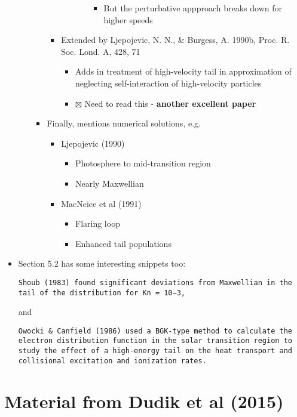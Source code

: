 \documentclass[11pt]{article}
\begin{document}
\begin{itemize}
\begin{itemize}
\begin{itemize}
\begin{itemize}
\begin{itemize}
\begin{itemize}
\begin{itemize}
\item But the perturbative appproach breaks down for higher speeds
\end{itemize}
\end{itemize}
\end{itemize}
\item Extended by Ljepojevic, N. N., \& Burgess, A. 1990b, Proc. R. Soc. Lond. A, 428, 71
\begin{itemize}
\item Adds in treatment of high-velocity tail in approximation of neglecting self-interaction of high-velocity particles
\item $\boxtimes$ Need to read this - \textbf{another excellent paper}
\end{itemize}
\end{itemize}
\item Finally, mentions numerical solutions, e.g.
\begin{itemize}
\item Ljepojevic (1990)
\begin{itemize}
\item Photosphere to mid-transition region
\item Nearly Maxwellian
\end{itemize}
\item MacNeice et al (1991)
\begin{itemize}
\item Flaring loop
\item Enhanced tail populations
\end{itemize}
\end{itemize}
\end{itemize}
\end{itemize}
\item Section 5.2 has some interesting snippets too:
\begin{verbatim}
Shoub (1983) found significant deviations from Maxwellian in the tail of the distribution for Kn = 10−3,
\end{verbatim}
and
\begin{verbatim}
Owocki & Canfield (1986) used a BGK-type method to calculate the electron distribution function in the solar transition region to study the effect of a high-energy tail on the heat transport and collisional excitation and ionization rates.
\end{verbatim}
\end{itemize}
\section{Material from Dudik et al (2015)}
\label{sec:orgheadline10}
\end{document}
